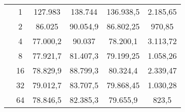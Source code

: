 \begin{table}[!h]
\begin{tabular}{|c|c|cccc|}
		& 1                                 &   127.983   &  138.744    &  136.938,5      &      2.185,65          \\
		& 2                                 &    86.025  &   90.054,9   &    86.802,25    &     970,85           \\
		& 4                                 &   77.000,2   &   90.037   &   78.200,1     &    3.113,72            \\
		& 8                                 &   77.921,7   &   81.407,3   &   79.199,25     &    1.058,26            \\
		& 16                                &  78.829,9    &    88.799,3  &    80.324,4   &      2.339,47          \\
		& 32                                &    79.012,7  &   83.707,5   &   79.868,45     &       1.030,28         \\
		& 64                                &  78.846,5    &   82.385,3   &    79.655,9    &      823,5         \\ \hline
	\end{tabular}
\end{table}
\twocolumn